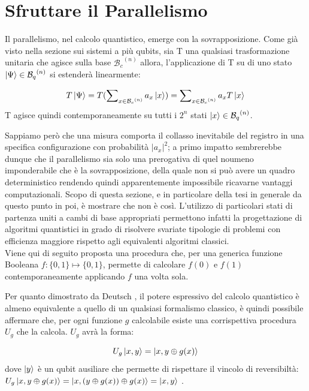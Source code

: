 \documentclass[12pt,a4paper,openright]{report}
\newcommand*\xor{\mathbin{\oplus}}
\begin{document}
\section{Sfruttare il Parallelismo}

Il parallelismo, nel calcolo quantistico, emerge con la sovrapposizione. Come già visto nella sezione sui sistemi a più qubits, sia T una qualsiasi trasformazione unitaria che agisce sulla base ${\mathcal{B}_c}^{(n)}$
allora, l'applicazione di T su di uno stato $\ket{\Psi}\in{{\mathcal{B}_q}^{(n)}}$ si estenderà linearmente:

\[
    T\ket{\Psi} = T(\sum\nolimits_{x \in {\mathcal{B}_c}^{(n)}} a_x \ket{x}) = \sum\nolimits_{x \in {\mathcal{B}_c}^{(n)}} a_x T\ket{x}
\]
T agisce quindi contemporaneamente su tutti i $2^n$ stati $\ket{x}\in{{\mathcal{B}_q}^{(n)}}$.

\par

Sappiamo però che una misura comporta il collasso inevitabile del registro in una specifica configurazione con probabilità ${\left\vert{a_x}\right\vert}^2$; a primo impatto sembrerebbe dunque che il parallelismo
sia solo una prerogativa di quel noumeno imponderabile che è la sovrapposizione, della quale non si può avere un quadro deterministico rendendo quindi apparentemente impossibile ricavarne vantaggi computazionali.
Scopo di questa sezione, e in particolare della tesi in generale da questo punto in poi, è mostrare che non è così. L'utilizzo di particolari stati di partenza uniti a cambi di base appropriati permettono infatti
la progettazione di algoritmi quantistici in grado di risolvere svariate tipologie di problemi con efficienza maggiore rispetto agli equivalenti algoritmi classici.\\
Viene qui di seguito proposta una procedura che, per una generica funzione Booleana $f:\{0,1\} \mapsto \{0,1\}$, permette di calcolare $f(0)$ e $f(1)$ contemporaneamente applicando $f$ una volta sola.\par
Per quanto dimostrato da Deutsch \cite{ref12}, il potere espressivo del calcolo quantistico è almeno equivalente a quello di un qualsiasi formalismo classico, è quindi possibile affermare che, per ogni funzione
$g$ calcolabile esiste una corrispettiva procedura $U_g$ che la calcola. $U_g$ avrà la forma:

\[
    U_g\ket{x,y} = \ket{x, y\xor g(x)}
\]
dove $\ket{y}$ è un qubit ausiliare che permette di rispettare il vincolo di reversibiltà: $U_g\ket{x, y \xor g(x)} = \ket{x, (y\xor g(x)) \xor g(x)} = \ket{x, y}$ .
\end{document}
